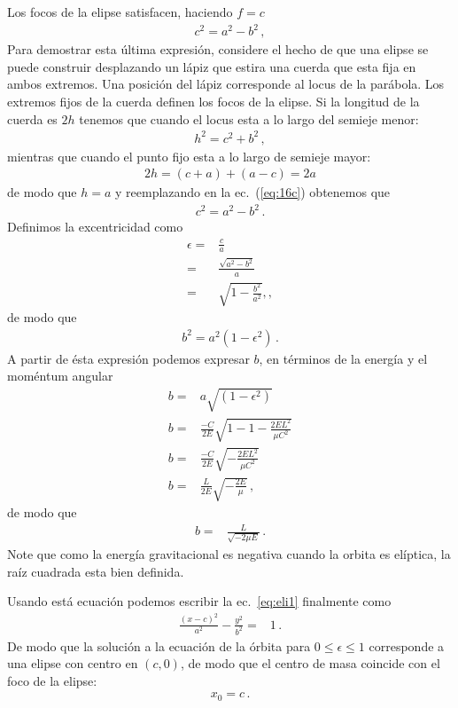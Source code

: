 Los focos de la elipse satisfacen, haciendo $f=c$
\begin{align}
  \label{eq:14c}
  c^2=a^2-b^2\,,
\end{align}
Para demostrar esta última expresión, considere el hecho de que una elipse se puede construir desplazando un lápiz que estira una cuerda que esta fija en ambos extremos. Una posición del lápiz corresponde al locus de la parábola. Los extremos fijos de la cuerda definen los focos de la elipse. Si la longitud de la cuerda es $2h$ tenemos que cuando el locus esta a lo largo del semieje menor:
\begin{align}
  \label{eq:16c}
h^2=c^2+b^2\,,
\end{align}
mientras que cuando el punto fijo esta a lo largo de semieje mayor:
\begin{align}
  2h=(c+a)+(a-c)=2a
\end{align}
de modo que $h=a$ y reemplazando en la ec.~(\ref{eq:16c}) obtenemos que
\begin{align}
  c^2=a^2-b^2\,.
\end{align}
Definimos la excentricidad como
\begin{align}
  \epsilon=&\frac{c}{a}\nonumber\\
  =&\frac{\sqrt{a^2-b^2}}{a}\nonumber\\
  =&\sqrt{1-\frac{b^2}{a^2}},,
\end{align}
de modo que
\begin{align}
  b^2=a^2(1-\epsilon^2)\,.
\end{align}
A partir de ésta expresión podemos expresar $b$, en términos de la energía y el moméntum angular
\begin{align*}
  b=&a\sqrt{(1-\epsilon^2)}\nonumber\\
  b=&\frac{-C}{2E}\sqrt{1-1-\frac{2EL^2}{\mu C^2}}\nonumber\\
  b=&\frac{-C}{2E}\sqrt{-\frac{2EL^2}{\mu C^2}}\nonumber\\
  b=&\frac{L}{2E}\sqrt{-\frac{2E}{\mu}}\,,
\end{align*}
de modo que
\begin{align}
  \label{eq:b}
  b=&\frac{L}{\sqrt{-2\mu E}}\,.
\end{align}
Note que como la energía gravitacional es negativa cuando la orbita es elíptica, la raíz cuadrada esta bien definida.

Usando está ecuación podemos escribir la ec.~\eqref{eq:eli1} finalmente como
\begin{align}
  \frac{(x-c)^2}{a^2}-\frac{y^2}{b^2}=&1\,.
\end{align}
De modo que la solución a la ecuación de la órbita para $0\le\epsilon\le 1$ corresponde a una elipse con centro en $(c,0)$, de modo que el centro de masa coincide con el foco de la elipse:
\begin{align}
  x_0=c\,.
\end{align}


